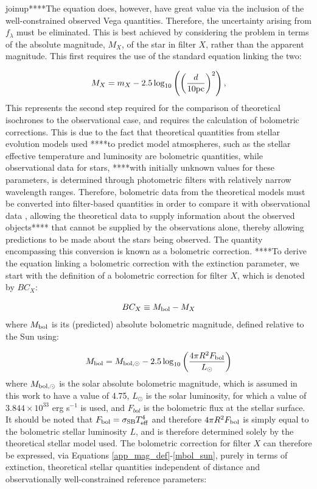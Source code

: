 \documentclass[12pt, a4paper]{report}
\begin{document}
joinup****The equation does, however, have great value via the inclusion of the well-constrained observed Vega quantities. Therefore, the uncertainty arising from $f_{\lambda}$ must be eliminated. This is best achieved by considering the problem in terms of the absolute magnitude, $M_{X}$, of the star in filter $X$, rather than the apparent magnitude. This first requires the use of the standard equation linking the two:

\begin{equation}
M_{X} = m_{X} - 2.5 \log_{10}\left( \left( \frac{d}{10 \textnormal{pc}} \right)^{2} \right),
\label{abs_mag_def}
\end{equation}
This represents the second step required for the comparison of theoretical isochrones to the observational case, and requires the calculation of bolometric corrections. This is due to the fact that theoretical quantities from stellar evolution models used ****to predict model atmospheres, such as the stellar effective temperature and luminosity are bolometric quantities, while observational data for stars, ****with initially unknown values for these parameters, is determined through photometric filters with relatively narrow wavelength ranges. Therefore, bolometric data from the theoretical models must be converted into filter-based quantities in order to compare it with observational data \citep{1996ApJ...469..355F}, allowing the theoretical data to supply information about the observed objects**** that cannot be supplied by the observations alone, thereby allowing predictions to be made about the stars being observed. The quantity encompassing this conversion is known as a bolometric correction. ****To derive the equation linking a bolometric correction with the extinction parameter, we start with the definition of a bolometric correction for filter $X$, which is denoted by $BC_{X}$:

\begin{equation}
BC_{X} \equiv M_{\textnormal{bol}} - M_{X}
\label{BC_def}
\end{equation}
where $M_{\textnormal{bol}}$ is its (predicted) absolute bolometric magnitude, defined relative to the Sun using:

\begin{equation}
M_{\textnormal{bol}} = M_{\textnormal{bol},\odot} - 2.5 \log_{10} \left( \frac{4\pi R^{2}F_{\textnormal{bol}}}{L_{\odot}} \right)
\label{mbol_sun}
\end{equation}
where $M_{\textnormal{bol},\odot}$ is the solar absolute bolometric magnitude, which is assumed in this work to have a value of 4.75, $L_{\odot}$ is the solar luminosity, for which a value of $3.844 \times 10^{33}$ erg s$^{-1}$ is used, and $F_{bol}$ is the bolometric flux at the stellar surface. It should be noted that $F_{\textnormal{bol}} = \sigma_{\textnormal{SB}} T_{\textnormal{eff}}^{4}$ and therefore $4\pi R^{2}F_{\textnormal{bol}}$ is simply equal to the bolometric stellar luminosity $L$, and is therefore determined solely by the theoretical stellar model used. The bolometric correction for filter $X$ can therefore be expressed, via Equations \ref{app_mag_def}-\ref{mbol_sun}, purely in terms of extinction, theoretical stellar quantities independent of distance and observationally well-constrained reference parameters:
\end{document}
